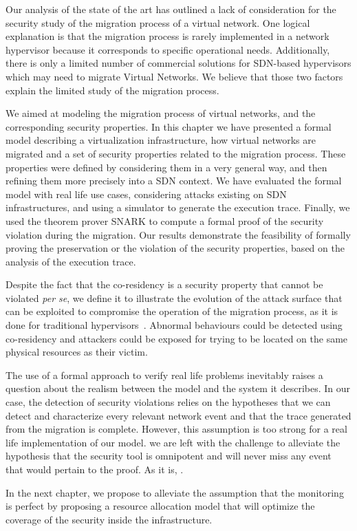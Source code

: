 Our analysis of the state of the art has outlined a lack of consideration for the security study of the migration process of a virtual network.
One logical explanation is that the migration process is rarely implemented in a network hypervisor because it corresponds to specific operational needs. Additionally, there is only a limited number of commercial solutions for SDN-based hypervisors which may need to migrate Virtual Networks. We believe that those two factors explain the limited study of the migration process.

We aimed at modeling the migration process of virtual networks, and the corresponding security properties.
In this chapter we have presented a formal model describing a virtualization infrastructure, how virtual networks are migrated  and a set of security properties related to the migration process. These properties were defined by considering them in a very general way, and then refining them more precisely into a SDN context. We have evaluated the formal model with real life use cases, considering attacks existing on SDN infrastructures, and using a simulator to generate the execution trace. Finally, we used the theorem prover SNARK to compute a formal proof of the security violation during the migration. Our results demonstrate the feasibility of formally proving the preservation or the violation of the security properties, based on the analysis of the execution trace.

Despite the fact that the co-residency is a security property that cannot be violated \textit{per se}, we define it to illustrate the evolution of the attack surface that can be exploited to compromise the operation of the migration process, as it is done for traditional hypervisors~\cite{stalling-atya2017,malicious-atya2017}.
Abnormal behaviours could be detected using co-residency and attackers could be exposed for trying to be located on the same physical resources as their victim. 

The use of a formal approach to verify real life problems inevitably raises a question about the realism between the model and the system it describes.
In our case, the detection of security violations relies on the hypotheses that we can detect and characterize every relevant network event and that the trace generated from the migration is complete. However, this assumption is too strong for a real life implementation of our model. we are left with the challenge to alleviate the hypothesis that the security tool is omnipotent and will never miss any event that would pertain to the proof. As it is, .

In the next chapter, we propose to alleviate the assumption that the monitoring is perfect by proposing a resource allocation model that will optimize the coverage of the security inside the infrastructure.